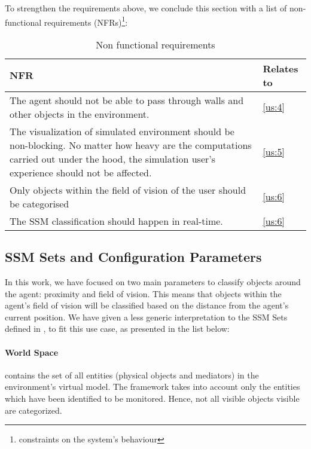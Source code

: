 To strengthen the requirements above, we conclude this section with a list of non-functional requirements (NFRs)\footnote{constraints on the system's behaviour}:
\begin{table}[H]
	\begin{center}
		\small \begin{tabular*}{1.1\columnwidth}{p{10cm}p{1.5cm}} 
			\\ \hline \hline
			NFR & Relates to \\ \hline \hline

		 	The agent should not be able to pass through walls and other objects in the environment. & \ref{us:4}\\ \hline

		 	The visualization of simulated environment should be non-blocking. No matter how heavy are the computations carried out under the hood, the simulation user's experience should not be affected. & \ref{us:5}\\ \hline

		 	Only objects within the field of vision of the user should be categorised & \ref{us:6}\\ \hline

		 	The SSM classification should happen in real-time. & \ref{us:6}\\ \hline

		\end{tabular*}
		
		\caption{Non functional requirements}
		\label{table:nfr}
	\end{center}
\end{table}

\subsection{SSM Sets and Configuration Parameters}\label{subsec:ssm_params}
In this work, we have focused on two main parameters to classify objects around the agent: proximity and field of vision. This means that objects within the agent's field of vision will be classified based on the distance from the agent's current position. We have given a less generic interpretation to the SSM Sets defined in \cite{pederson2011situative}, to fit this use case, as presented in the list below:
\paragraph{World Space} contains the set of all entities (physical objects and mediators) in the environment's virtual model. The framework takes into account only the entities which have been identified to be monitored. Hence, not all visible objects visible are categorized.
